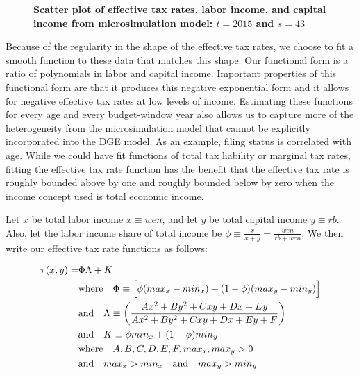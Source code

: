 \documentclass[letterpaper,12pt]{article}
\theoremstyle{definition}
\begin{document}
\begin{spacing}{1.5}
    \begin{figure}[htbp]\centering \captionsetup{width=4.0in}
      \caption{\label{FigMicroTaxData3D}\textbf{Scatter plot of effective tax rates, labor income, and capital income from microsimulation model: $t=2015$ and $s=43$}}
    \end{figure}

    Because of the regularity in the shape of the effective tax rates, we choose to fit a smooth function to these data that matches this shape. Our functional form is a ratio of polynomials in labor and capital income. Important properties of this functional form are that it produces this negative exponential form and it allows for negative effective tax rates at low levels of income. Estimating these functions for every age and every budget-window year also allows us to capture more of the heterogeneity from the microsimulation model that cannot be explicitly incorporated into the DGE model. As an example, filing status is correlated with age. While we could have fit functions of total tax liability or marginal tax rates, fitting the effective tax rate function has the benefit that the effective tax rate is roughly bounded above by one and roughly bounded below by zero when the income concept used is total economic income.

    Let $x$ be total labor income $x\equiv wen$, and let $y$ be total capital income $y\equiv rb$. Also, let the labor income share of total income be $\phi\equiv\frac{x}{x+y}=\frac{wen}{rb + wen}$.  We then write our effective tax rate functions as follows:

    \begin{equation}\label{EqATR}
      \begin{split}
        \tau(x,y) = &\Phi\Lambda + K \\
        &\text{where}\quad \Phi \equiv \Bigl[\phi(max_x - min_x) + (1 - \phi)(max_y - min_y)\Bigr] \\
        &\text{and}\quad \Lambda \equiv \biggl(\frac{Ax^2 + By^2 + Cxy + Dx + Ey}{Ax^2 + By^2 + Cxy + Dx + Ey + F}\biggr) \\
        &\text{and}\quad K \equiv \phi min_x + (1 - \phi)min_y \\
        &\text{where}\quad A,B,C,D,E,F,max_x,max_y > 0 \\
        &\text{and}\quad max_x > min_x \quad\text{and}\quad max_y > min_y
      \end{split}
    \end{equation}


\end{spacing}
\end{document}
